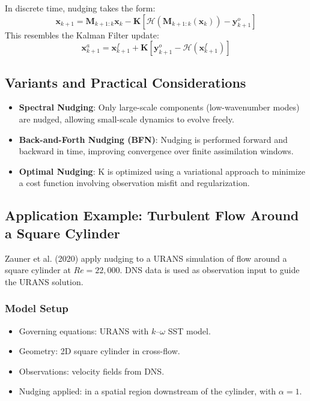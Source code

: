 In discrete time, nudging takes the form:
\[
\mathbf{x}_{k+1} = \mathbf{M}_{k+1:k} \mathbf{x}_k - \mathbf{K} \left[ \mathcal{H}(\mathbf{M}_{k+1:k}(\mathbf{x}_k)) - \mathbf{y}_{k+1}^o \right]
\]
This resembles the Kalman Filter update:
\[
\mathbf{x}_{k+1}^a = \mathbf{x}_{k+1}^f + \mathbf{K} \left[ \mathbf{y}_{k+1}^o - \mathcal{H}(\mathbf{x}_{k+1}^f) \right]
\]

\subsection{Variants and Practical Considerations}

\begin{itemize}
  \item \textbf{Spectral Nudging}: Only large-scale components (low-wavenumber modes) are nudged, allowing small-scale dynamics to evolve freely.
  \item \textbf{Back-and-Forth Nudging (BFN)}: Nudging is performed forward and backward in time, improving convergence over finite assimilation windows.
  \item \textbf{Optimal Nudging}: K is optimized using a variational approach to minimize a cost function involving observation misfit and regularization.
\end{itemize}

\subsection{Application Example: Turbulent Flow Around a Square Cylinder}

Zauner et al. (2020) apply nudging to a URANS simulation of flow around a square cylinder at $Re = 22{,}000$. DNS data is used as observation input to guide the URANS solution.

\subsubsection*{Model Setup}

\begin{itemize}
  \item Governing equations: URANS with $k$--$\omega$ SST model.
  \item Geometry: 2D square cylinder in cross-flow.
  \item Observations: velocity fields from DNS.
  \item Nudging applied: in a spatial region downstream of the cylinder, with $\alpha = 1$.
\end{itemize}

